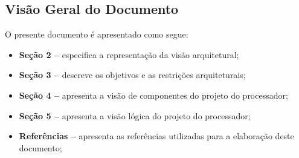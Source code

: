 \documentclass{article}
\begin{document}
\subsection{Visão Geral do Documento}
O presente documento é apresentado como segue:
  \begin{itemize}
       \item \textbf{Seção 2 --} especifica a representação da visão arquitetural;
       \item \textbf{Seção 3 --} descreve os objetivos e as restrições arquiteturais;
       \item \textbf{Seção 4 --} apresenta a visão de componentes do projeto do processador;
       \item \textbf{Seção 5 --} apresenta a visão lógica do projeto do processador;
       \item \textbf{Referências --} apresenta  as  referências  utilizadas  para  a  elaboração  deste documento;
  \end{itemize}
  
  
\end{document}
